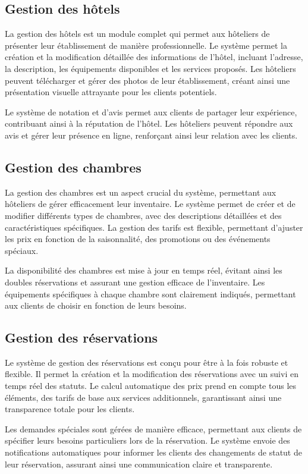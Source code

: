 \documentclass[12pt,a4paper]{report}
\begin{document}
\subsection{Gestion des hôtels}
La gestion des hôtels est un module complet qui permet aux hôteliers de présenter leur établissement de manière professionnelle. Le système permet la création et la modification détaillée des informations de l'hôtel, incluant l'adresse, la description, les équipements disponibles et les services proposés. Les hôteliers peuvent télécharger et gérer des photos de leur établissement, créant ainsi une présentation visuelle attrayante pour les clients potentiels.

Le système de notation et d'avis permet aux clients de partager leur expérience, contribuant ainsi à la réputation de l'hôtel. Les hôteliers peuvent répondre aux avis et gérer leur présence en ligne, renforçant ainsi leur relation avec les clients.

\subsection{Gestion des chambres}
La gestion des chambres est un aspect crucial du système, permettant aux hôteliers de gérer efficacement leur inventaire. Le système permet de créer et de modifier différents types de chambres, avec des descriptions détaillées et des caractéristiques spécifiques. La gestion des tarifs est flexible, permettant d'ajuster les prix en fonction de la saisonnalité, des promotions ou des événements spéciaux.

La disponibilité des chambres est mise à jour en temps réel, évitant ainsi les doubles réservations et assurant une gestion efficace de l'inventaire. Les équipements spécifiques à chaque chambre sont clairement indiqués, permettant aux clients de choisir en fonction de leurs besoins.

\subsection{Gestion des réservations}
Le système de gestion des réservations est conçu pour être à la fois robuste et flexible. Il permet la création et la modification des réservations avec un suivi en temps réel des statuts. Le calcul automatique des prix prend en compte tous les éléments, des tarifs de base aux services additionnels, garantissant ainsi une transparence totale pour les clients.

Les demandes spéciales sont gérées de manière efficace, permettant aux clients de spécifier leurs besoins particuliers lors de la réservation. Le système envoie des notifications automatiques pour informer les clients des changements de statut de leur réservation, assurant ainsi une communication claire et transparente.
\end{document}

